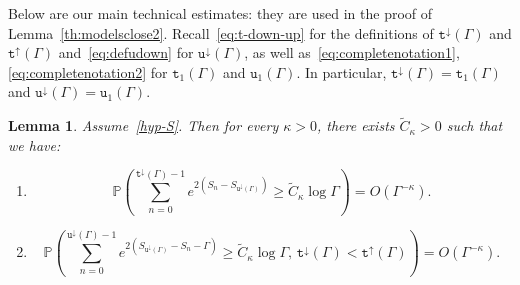 \documentclass[10pt]{amsart}
\newtheorem{lemm}[theo]{Lemma}\newtheorem{prop}[theo]{Proposition}\newtheorem{coro}[theo]{Corollary}\newtheorem{conj}[theo]{Conjecture}
\theoremstyle{definition}\newtheorem{defi}[theo]{Definition}\newtheorem{rema}[theo]{Remark}\newtheorem{exam}[theo]{Example}\newtheorem{exem}[theo]{Example}\newtheorem{nota}[theo]{Notation}
\newcommand{\bbP}{\mathbb{P}}
\newcommand{\gG}{\Gamma}
\renewcommand*\ss{\mathtt{u}}
\newcommand{\ttt}{\mathtt{t}}
\newcommand*\td{{\ttt}^\downarrow}
\newcommand*\tup{{\ttt}^\uparrow}
\newcommand{\tudown}{\ss^\downarrow}
\newcommand*{\relabel}{\renewcommand{\labelenumi}{(\theenumi)}}
\newcommand*{\romanenumi}{\renewcommand*{\theenumi}{\roman{enumi}}\relabel}
\begin{document}
Below are our main technical estimates: they are used in the proof of Lemma~\ref{th:modelsclose2}. {Recall~\eqref{eq:t-down-up} for the definitions of $\td(\gG)$ and $\tup(\gG)$ and~\eqref{eq:defudown} for $\tudown(\Gamma)$, as well as~\eqref{eq:completenotation1}, \eqref{eq:completenotation2} for $\ttt_1(\Gamma)$ and $\ss_1(\Gamma)$. In particular, $\td(\gG)= \ttt_1(\Gamma)$ and $\tudown(\Gamma)=\ss_1(\Gamma)$.}


\pagebreak
\begin{lemm}\label{th:expomoments}
Assume~\eqref{hyp-S}. Then for every $\kappa>0$, there exists $\widetilde{C}_\kappa>0$ such that we have:
\begin{enumerate}\romanenumi
\item \label{lemmA.3.1}
\begin{equation}\label{expon1}
\bbP\left(\sum_{n=0}^{\td(\Gamma)-1} e^{2\left(S_n-S_{\tudown(\Gamma)}\right)}
\ge \widetilde{C}_\kappa \log \gG\right)=O\left(\gG^{-\kappa}\right).
\end{equation}
\item\label{lemmA.3.2}
\begin{equation}\label{expon2}
\bbP\left(\sum_{n=0}^{\tudown(\gG)-1} e^{2\left(S_{\tudown(\gG)}-S_n-\Gamma\right)}
\ge \widetilde{C}_\kappa \log \gG, \, \td(\gG)<\tup(\gG)\right)=O\left(\gG^{-\kappa}\right). 
\end{equation}
\end{enumerate}
\end{lemm}
\end{document}
